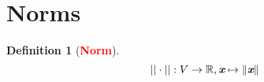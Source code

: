 \documentclass[12pt]{article}
\theoremstyle{definition}
\newtheorem{definition}{Definition}[section]
\newcommand{\keyword}[1]{\textbf{\textcolor{red}{#1}}}
\newcommand{\mat}[1]{\textit{\textbf{#1}}}
\begin{document}
    \section{Norms}
    \begin{definition}[\keyword{Norm}]
        \begin{equation*}
            ||\cdot|| :V\rightarrow\mathbb{R}, \mat{x} \mapsto \norm{\mat{x}}
        \end{equation*}
    \end{definition}
\end{document}

